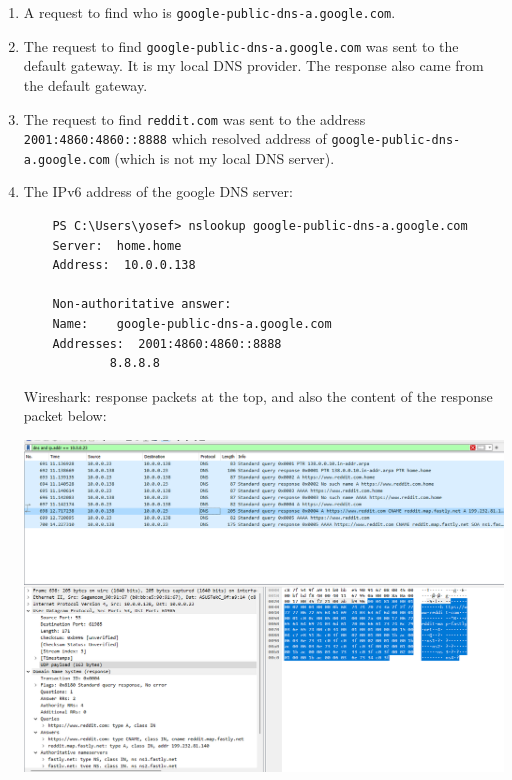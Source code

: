 \begin{enumerate}[label=\textbf{\alph*.}]
\begin{center}
    \end{center}
    \item A request to find who is \texttt{google-public-dns-a.google.com}.
    \item The request to find \texttt{google-public-dns-a.google.com} was sent to the default gateway. It is my local DNS provider.
    The response also came from the default gateway.
    \item The request to find \texttt{reddit.com} was sent to the address \texttt{2001:4860:4860::8888}
    which resolved address of \texttt{google-public-dns-a.google.com} (which is not my local DNS server).
    \item The IPv6 address of the google DNS server:
    \begin{verbatim}
    PS C:\Users\yosef> nslookup google-public-dns-a.google.com           
    Server:  home.home
    Address:  10.0.0.138

    Non-authoritative answer:
    Name:    google-public-dns-a.google.com
    Addresses:  2001:4860:4860::8888
            8.8.8.8
    \end{verbatim}
    Wireshark:
    response packets at the top, and also the content of the response packet below:
    \begin{center}
        \includegraphics[width=1.2 \textwidth]{resources/dns4.png}\centering
    \end{center}


    
\end{enumerate}
